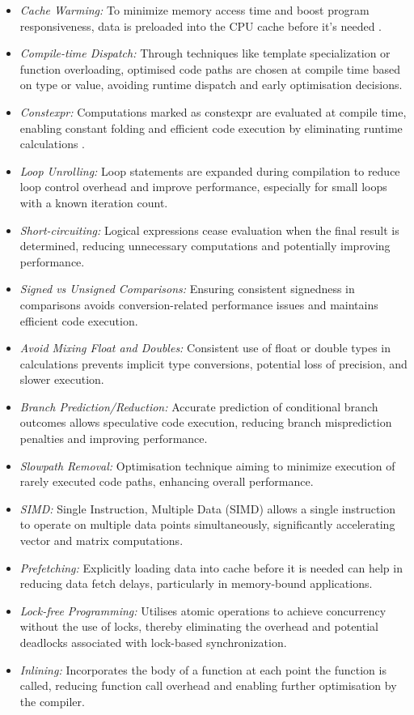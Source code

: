 \documentclass{article}
\theoremstyle{break}
\begin{document}
\begin{itemize}
    \item \textit{Cache Warming:} To minimize memory access time and boost program responsiveness, data is preloaded into the CPU cache before it's needed \cite{9}.
    \item \textit{Compile-time Dispatch:} Through techniques like template specialization or function overloading, optimised code paths are chosen at compile time based on type or value, avoiding runtime dispatch and early optimisation decisions.
    \item \textit{Constexpr:} Computations marked as constexpr are evaluated at compile time, enabling constant folding and efficient code execution by eliminating runtime calculations \cite{10}.
    \item \textit{Loop Unrolling:} Loop statements are expanded during compilation to reduce loop control overhead and improve performance, especially for small loops with a known iteration count.
    \item \textit{Short-circuiting:} Logical expressions cease evaluation when the final result is determined, reducing unnecessary computations and potentially improving performance.
    \item \textit{Signed vs Unsigned Comparisons:} Ensuring consistent signedness in comparisons avoids conversion-related performance issues and maintains efficient code execution.
    \item \textit{Avoid Mixing Float and Doubles:} Consistent use of float or double types in calculations prevents implicit type conversions, potential loss of precision, and slower execution.
    \item \textit{Branch Prediction/Reduction:} Accurate prediction of conditional branch outcomes allows speculative code execution, reducing branch misprediction penalties and improving performance.
    \item \textit{Slowpath Removal:} Optimisation technique aiming to minimize execution of rarely executed code paths, enhancing overall performance.
    \item \textit{SIMD:} Single Instruction, Multiple Data (SIMD) allows a single instruction to operate on multiple data points simultaneously, significantly accelerating vector and matrix computations.
    \item \textit{Prefetching:} Explicitly loading data into cache before it is needed can help in reducing data fetch delays, particularly in memory-bound applications.
    \item \textit{Lock-free Programming:} Utilises atomic operations to achieve concurrency without the use of locks, thereby eliminating the overhead and potential deadlocks associated with lock-based synchronization.
    \item \textit{Inlining:} Incorporates the body of a function at each point the function is called, reducing function call overhead and enabling further optimisation by the compiler.
\end{itemize}
\end{document}
